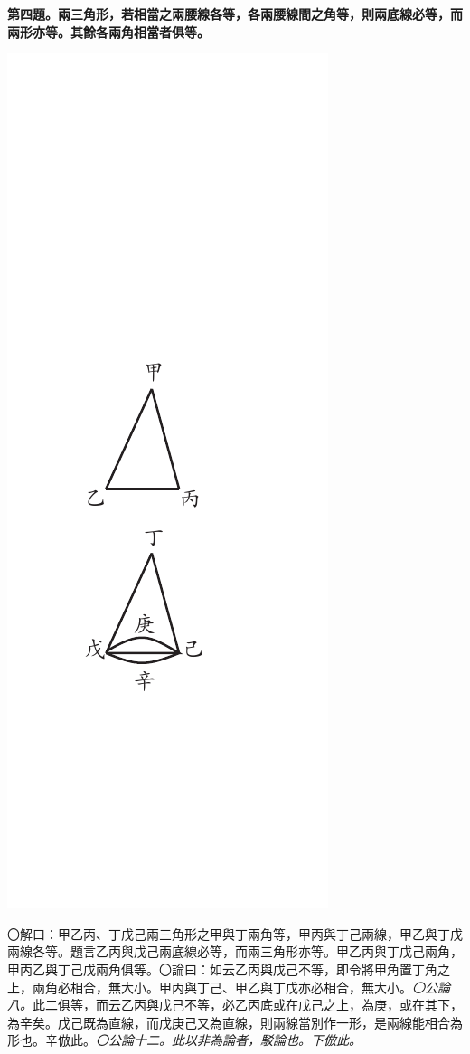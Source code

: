 \documentclass[12pt,b5paper,landscape]{article}
\newcommand{\ccom}[1]{{\footnotesize \emph{〇#1}}}
\newcommand{\bcom}[1]{〇#1}
\newcommand{\cthm}[1]{{
\vspace{8pt}

\bfseries #1}}
\begin{document}
\begin{multicols}{2}
\cthm{第四題。兩三角形，若相當之兩腰線各等，各兩腰線間之角等，則兩底線必等，而兩形亦等。其餘各兩角相當者俱等。}
\begin{center}
\includegraphics[angle=90]{eu38}
\end{center}
\bcom{解曰：甲乙丙、丁戊己兩三角形之甲與丁兩角等，甲丙與丁己兩線，甲乙與丁戊兩線各等。題言乙丙與戊己兩底線必等，而兩三角形亦等。甲乙丙與丁戊己兩角，甲丙乙與丁己戊兩角俱等。}\bcom{論曰：如云乙丙與戊己不等，即令將甲角置丁角之上，兩角必相合，無大小。甲丙與丁己、甲乙與丁戊亦必相合，無大小。\ccom{公論八。}此二俱等，而云乙丙與戊己不等，必乙丙底或在戊己之上，為庚，或在其下，為辛矣。戊己既為直線，而戊庚己又為直線，則兩線當別作一形，是兩線能相合為形也。辛倣此。\ccom{公論十二。此以非為論者，駁論也。下倣此。}}


\end{multicols}
\end{document}

